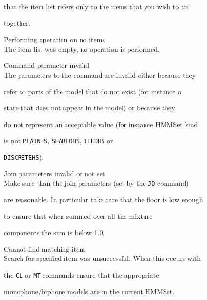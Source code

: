 \begin{itemize}
\begin{itemize}
        that the item list refers only to the items that you wish to tie 


        together.





    Performing operation on no items\\


        The item list was empty, no operation is performed.





    Command parameter invalid\\


        The parameters to the command are invalid either because they


        refer to parts of the model that do not exist (for instance a


        state that does not appear in the model) or because they 


        do not represent an acceptable value (for instance HMMSet kind


        is not \texttt{PLAINHS}, \texttt{SHAREDHS}, \texttt{TIEDHS} or 


        \texttt{DISCRETEHS}).





    Join parameters invalid or not set\\


        Make sure than the join parameters (set by the \texttt{JO} command)


        are reasonable.  In particular take care that the floor is low enough 


        to ensure that when summed over all the mixture


        components the sum is below 1.0.





    Cannot find matching item\\


        Search for specified item was unsuccessful.  When this occurs with


        the \texttt{CL} or \texttt{MT} commands ensure that the appropriate 


        monophone/biphone models are in the current HMMSet.






\end{itemize}
\end{itemize}
